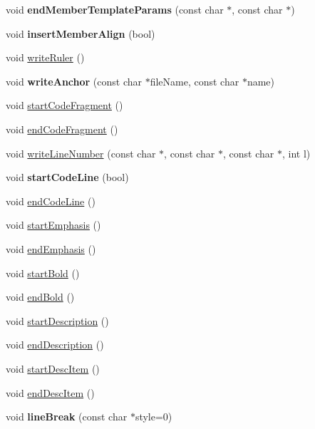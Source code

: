 \begin{DoxyCompactItemize}
\item 
\hypertarget{class_r_t_f_generator_ab9823a1d24c83284ff21781c8caa8487}{void {\bfseries end\-Member\-Template\-Params} (const char $\ast$, const char $\ast$)}\label{class_r_t_f_generator_ab9823a1d24c83284ff21781c8caa8487}

\item 
\hypertarget{class_r_t_f_generator_a77394a193203024cb6dc72bea70ab195}{void {\bfseries insert\-Member\-Align} (bool)}\label{class_r_t_f_generator_a77394a193203024cb6dc72bea70ab195}

\item 
void \hyperlink{class_r_t_f_generator_a9fd641c75c5b5ee59a974c3b476584c2}{write\-Ruler} ()
\item 
\hypertarget{class_r_t_f_generator_ad10e211d7701ea029222192f10efdf8e}{void {\bfseries write\-Anchor} (const char $\ast$file\-Name, const char $\ast$name)}\label{class_r_t_f_generator_ad10e211d7701ea029222192f10efdf8e}

\item 
void \hyperlink{class_r_t_f_generator_a631953fed580c2b82e39426604c928ac}{start\-Code\-Fragment} ()
\item 
void \hyperlink{class_r_t_f_generator_a0d97d57c34ed239bcf916104a71e10bf}{end\-Code\-Fragment} ()
\item 
void \hyperlink{class_r_t_f_generator_a041516b65f9f2c22d2c0941419200cbb}{write\-Line\-Number} (const char $\ast$, const char $\ast$, const char $\ast$, int l)
\item 
\hypertarget{class_r_t_f_generator_aa76dc2000bd743981f13bb8953b51499}{void {\bfseries start\-Code\-Line} (bool)}\label{class_r_t_f_generator_aa76dc2000bd743981f13bb8953b51499}

\item 
void \hyperlink{class_r_t_f_generator_adbe51a89cf6f9573b3434e7cfda81a7c}{end\-Code\-Line} ()
\item 
void \hyperlink{class_r_t_f_generator_ab2f79d1f1a30e329f7ada3e51c04917e}{start\-Emphasis} ()
\item 
void \hyperlink{class_r_t_f_generator_a5c4adfb425dee0e192e5b606eab0114a}{end\-Emphasis} ()
\item 
void \hyperlink{class_r_t_f_generator_a6f230bea6c80b0a1847a9608c88fd45a}{start\-Bold} ()
\item 
void \hyperlink{class_r_t_f_generator_a1e1a209879148bfcb4b57ab294b37b90}{end\-Bold} ()
\item 
void \hyperlink{class_r_t_f_generator_ae87205938a124b2eac0d798631d4e5e6}{start\-Description} ()
\item 
void \hyperlink{class_r_t_f_generator_a5a0a6eb710a6b87c5dd8ea82b7a19dc4}{end\-Description} ()
\item 
void \hyperlink{class_r_t_f_generator_ab8a6797fe2e4cb968a4c13eea7c4c968}{start\-Desc\-Item} ()
\item 
void \hyperlink{class_r_t_f_generator_a080b8f2fa36e665da60bcfa982386ac8}{end\-Desc\-Item} ()
\item 
\hypertarget{class_r_t_f_generator_a8c56a0949062c0b6a199c9d9f16a67a5}{void {\bfseries line\-Break} (const char $\ast$style=0)}\label{class_r_t_f_generator_a8c56a0949062c0b6a199c9d9f16a67a5}


\end{DoxyCompactItemize}
